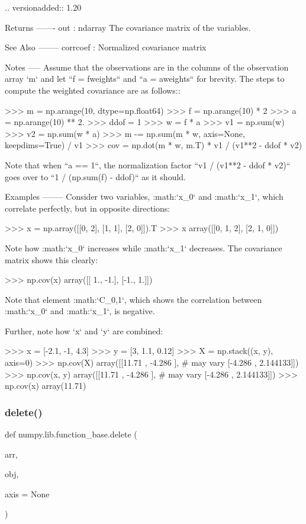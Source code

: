 \begin{DoxyVerb}
    .. versionadded:: 1.20

Returns
-------
out : ndarray
    The covariance matrix of the variables.

See Also
--------
corrcoef : Normalized covariance matrix

Notes
-----
Assume that the observations are in the columns of the observation
array `m` and let ``f = fweights`` and ``a = aweights`` for brevity. The
steps to compute the weighted covariance are as follows::

    >>> m = np.arange(10, dtype=np.float64)
    >>> f = np.arange(10) * 2
    >>> a = np.arange(10) ** 2.
    >>> ddof = 1
    >>> w = f * a
    >>> v1 = np.sum(w)
    >>> v2 = np.sum(w * a)
    >>> m -= np.sum(m * w, axis=None, keepdims=True) / v1
    >>> cov = np.dot(m * w, m.T) * v1 / (v1**2 - ddof * v2)

Note that when ``a == 1``, the normalization factor
``v1 / (v1**2 - ddof * v2)`` goes over to ``1 / (np.sum(f) - ddof)``
as it should.

Examples
--------
Consider two variables, :math:`x_0` and :math:`x_1`, which
correlate perfectly, but in opposite directions:

>>> x = np.array([[0, 2], [1, 1], [2, 0]]).T
>>> x
array([[0, 1, 2],
       [2, 1, 0]])

Note how :math:`x_0` increases while :math:`x_1` decreases. The covariance
matrix shows this clearly:

>>> np.cov(x)
array([[ 1., -1.],
       [-1.,  1.]])

Note that element :math:`C_{0,1}`, which shows the correlation between
:math:`x_0` and :math:`x_1`, is negative.

Further, note how `x` and `y` are combined:

>>> x = [-2.1, -1,  4.3]
>>> y = [3,  1.1,  0.12]
>>> X = np.stack((x, y), axis=0)
>>> np.cov(X)
array([[11.71      , -4.286     ], # may vary
       [-4.286     ,  2.144133]])
>>> np.cov(x, y)
array([[11.71      , -4.286     ], # may vary
       [-4.286     ,  2.144133]])
>>> np.cov(x)
array(11.71)\end{DoxyVerb}
 \mbox{\label{namespacenumpy_1_1lib_1_1function__base_a2218207bd0ba2467c0e3a11575940b15}} 
\subsubsection{\texorpdfstring{delete()}{delete()}}
{\footnotesize\ttfamily def numpy.\+lib.\+function\+\_\+base.\+delete (\begin{DoxyParamCaption}\item[{}]{arr,  }\item[{}]{obj,  }\item[{}]{axis = {\ttfamily None} }\end{DoxyParamCaption})}

